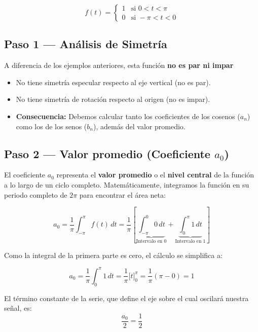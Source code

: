 \documentclass[
  letterpaper,
  DIV=11,
  numbers=noendperiod]{scrreprt}
\providecommand{\tightlist}{%
  \setlength{\itemsep}{0pt}\setlength{\parskip}{0pt}}
\begin{document}
\[
f(t) = \begin{cases} 1 & \text{si } 0 < t < \pi \\ 0 & \text{si } -\pi < t < 0 \end{cases}
\]

\subsection{Paso 1 --- Análisis de
Simetría}\label{paso-1-anuxe1lisis-de-simetruxeda-2}

A diferencia de los ejemplos anteriores, esta función \textbf{no es par
ni impar}

\begin{itemize}
\tightlist
\item
  No tiene simetría especular respecto al eje vertical (no es par).
\item
  No tiene simetría de rotación respecto al origen (no es impar).
\item
  \textbf{Consecuencia:} Debemos calcular tanto los coeficientes de los
  cosenos (\(a_n\)) como los de los senos (\(b_n\)), además del valor
  promedio.
\end{itemize}

\subsection{\texorpdfstring{Paso 2 --- Valor promedio (Coeficiente
\(a_0\))}{Paso 2 --- Valor promedio (Coeficiente a\_0)}}\label{paso-2-valor-promedio-coeficiente-a_0-1}

El coeficiente \(a_0\) representa el \textbf{valor promedio} o el
\textbf{nivel central} de la función a lo largo de un ciclo completo.
Matemáticamente, integramos la función en su periodo completo de
\(2\pi\) para encontrar el área neta:

\[
a_0 = \frac{1}{\pi} \int_{-\pi}^{\pi} f(t) \, dt = \frac{1}{\pi} \left[ \underbrace{\int_{-\pi}^{0} 0 \, dt}_{\text{Intervalo en 0}} + \underbrace{\int_{0}^{\pi} 1 \, dt}_{\text{Intervalo en 1}} \right]
\]

Como la integral de la primera parte es cero, el cálculo se simplifica
a:

\[
a_0 = \frac{1}{\pi} \int_{0}^{\pi} 1 \, dt = \frac{1}{\pi} \Big[ t \Big]_0^{\pi} = \frac{1}{\pi} (\pi - 0) = 1
\]

El término constante de la serie, que define el eje sobre el cual
oscilará nuestra señal, es: \[\frac{a_0}{2} = \frac{1}{2}\]
\end{document}
